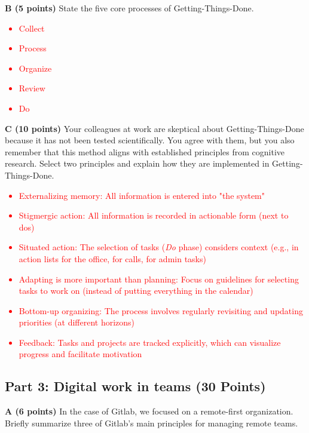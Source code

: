 \documentclass[12pt]{scrartcl}
\begin{document}
\vspace{0.3cm}

\textbf{B (5 points)} State the five core processes of Getting-Things-Done.

\textcolor{red}{
	\begin{itemize}
		\item Collect
		\item Process
		\item Organize
		\item Review
		\item Do
	\end{itemize}	
}

\vspace{0.3cm}
\textbf{C (10 points)} Your colleagues at work are skeptical about Getting-Things-Done because it has not been tested scientifically. You agree with them, but you also remember that this method aligns with established principles from cognitive research. Select two principles and explain how they are implemented in Getting-Things-Done.

\textcolor{red}{
	\begin{itemize}
		\item Externalizing memory: All information is entered into "the system"
		\item Stigmergic action: All information is recorded in actionable form (next to dos)
		\item Situated action: The selection of tasks (\textit{Do} phase) considers context (e.g., in action lists for the office, for calls, for admin tasks)
		\item Adapting is more important than planning: Focus on guidelines for selecting tasks to work on (instead of putting everything in the calendar)
		\item Bottom-up organizing: The process involves regularly revisiting and updating priorities (at different horizons)
		\item Feedback: Tasks and projects are tracked explicitly, which can visualize progress and facilitate motivation
	\end{itemize}	
}

\vspace{0.3cm}

\subsection*{Part 3: Digital work in teams (30 Points)}

\textbf{A (6 points)} In the case of Gitlab, we focused on a remote-first organization. Briefly summarize three of Gitlab's main principles for managing remote teams.
\end{document}
